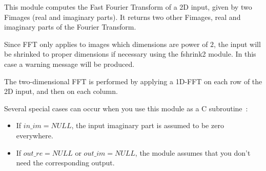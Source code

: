 This module computes the Fast Fourier Transform of a 2D input, given
by two Fimages (real and imaginary parts). It returns two other Fimages,
real and imaginary parts of the Fourier Transform. 

\vskip 0.3cm

Since FFT only applies
to images which dimensions are power of $2$, the input will be shrinked 
to proper dimensions if necessary using the {\sf fshrink2} module. In this
case a warning message will be produced.

\vskip 0.3cm

The two-dimensional FFT is performed by applying a 1D-FFT on each row
of the 2D input, and then on each column.

\vskip 0.3cm

Several special cases can occur when you use this module as a 
C subroutine~:
\begin{itemize}
\item If $in\_im=NULL$, the input imaginary part is assumed to be zero 
everywhere.
\item If $out\_re=NULL$ or $out\_im=NULL$, the module assumes that you
don't need the corresponding output.
\end{itemize}

